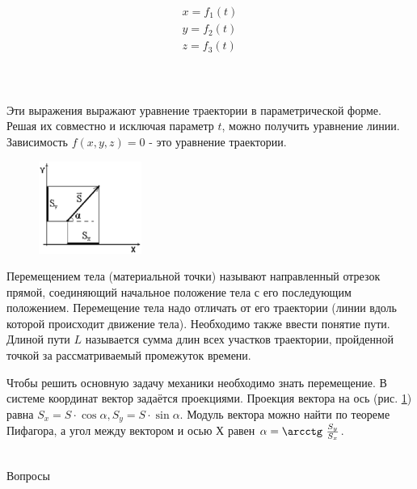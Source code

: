 \documentclass[a5paper, 10pt]{diss_4}
\renewcommand{\'}{\,'}
\begin{document}
\begin{gather*}
x=f_1(t)\\
y=f_2(t)\\
z=f_3(t)
\end{gather*}
\\
\\
\\

  Эти выражения выражают уравнение траектории в параметрической форме.
Решая их совместно и исключая параметр $t$, можно получить уравнение линии.
Зависимость $f(x,y,z)=0$ - это уравнение траектории.\\

\begin{figure}
\includegraphics[width=0.3\textwidth]{img/img06.eps}
\caption{}
\label{fig6}
\end{figure}
  Перемещением тела (материальной точки) называют направленный отрезок
прямой, соединяющий начальное положение тела с его последующим положением.
Перемещение тела надо отличать от его траектории (линии вдоль которой
происходит движение тела). Необходимо также ввести понятие пути. Длиной пути $L$
называется сумма длин всех участков траектории, пройденной точкой за
рассматриваемый промежуток времени.

  Чтобы решить основную задачу механики необходимо знать перемещение. В
системе координат вектор задаётся проекциями. Проекция вектора на ось (рис. \ref{fig6}) равна
$S_x=S\cdot \cos\alpha, S_y=S\cdot \sin\alpha$. Модуль вектора можно найти по
теореме Пифагора, а угол между вектором и осью $Х$ равен $\alpha=\arcctg\ \frac{S_y}{S_x}$.
\\
\\

\begin{center}
   Вопросы
\end{center}
\end{document}
